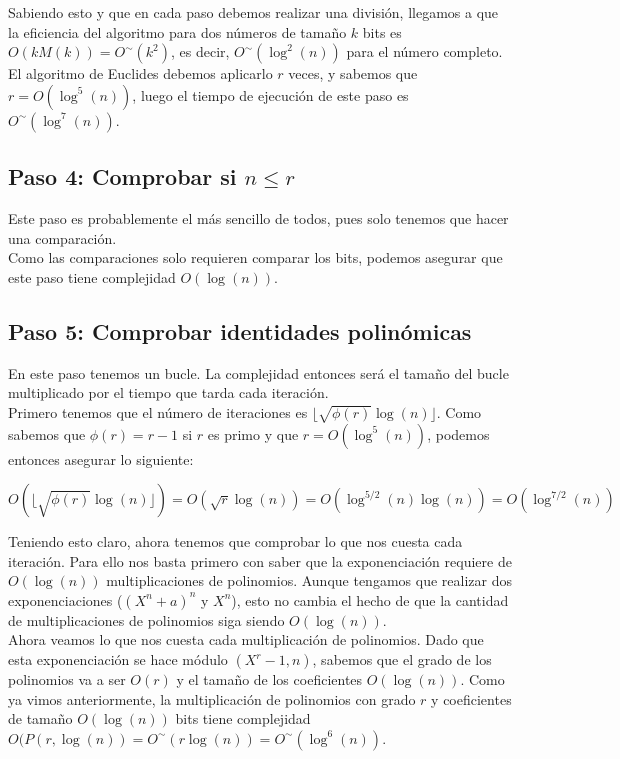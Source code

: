 Sabiendo esto y que en cada paso debemos realizar una división, llegamos a que la eficiencia del algoritmo para dos números de tamaño $k$ bits es $O(kM(k)) = O^\sim(k^2)$, es decir, $O^\sim(\log^2(n))$ para el número completo.\\

El algoritmo de Euclides debemos aplicarlo $r$ veces, y sabemos que $r = O(\log^5(n))$, luego el tiempo de ejecución de este paso es $O^\sim(\log^7(n))$.

\subsection{Paso 4: Comprobar si $n \leq r$}

Este paso es probablemente el más sencillo de todos, pues solo tenemos que hacer una comparación.\\

Como las comparaciones solo requieren comparar los bits, podemos asegurar que este paso tiene complejidad $O(\log(n))$.

\subsection{Paso 5: Comprobar identidades polinómicas}

En este paso tenemos un bucle. La complejidad entonces será el tamaño del bucle multiplicado por el tiempo que tarda cada iteración.\\

Primero tenemos que el número de iteraciones es $\lfloor \sqrt{\phi(r)}\log(n) \rfloor$. Como sabemos que $\phi(r) = r-1$ si $r$ es primo y que $r = O(\log^5(n))$, podemos entonces asegurar lo siguiente:

$$O\left(\lfloor \sqrt{\phi(r)}\log(n) \rfloor\right) = O(\sqrt{r}\log(n)) = O(\log^{5/2}(n)\log(n)) = O(\log^{7/2}(n))$$

Teniendo esto claro, ahora tenemos que comprobar lo que nos cuesta cada iteración. Para ello nos basta primero con saber que la exponenciación requiere de $O(\log(n))$ multiplicaciones de polinomios. Aunque tengamos que realizar dos exponenciaciones ($(X^n + a)^n$ y $X^n$), esto no cambia el hecho de que la cantidad de multiplicaciones de polinomios siga siendo $O(\log(n))$.\\

Ahora veamos lo que nos cuesta cada multiplicación de polinomios. Dado que esta exponenciación se hace módulo $(X^r - 1, n)$, sabemos que el grado de los polinomios va a ser $O(r)$ y el tamaño de los coeficientes $O(\log(n))$. Como ya vimos anteriormente, la multiplicación de polinomios con grado $r$ y coeficientes de tamaño $O(\log(n))$ bits tiene complejidad $O(P(r, \log(n)) = O^\sim(r\log(n)) = O^\sim(\log^6(n))$.\\

